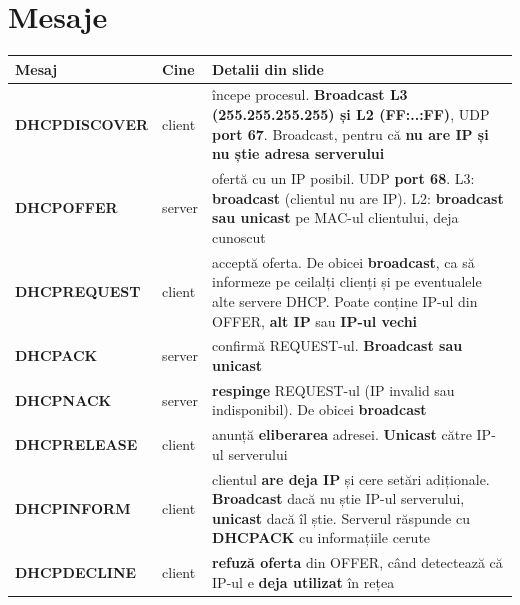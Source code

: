 \documentclass[11pt,a4paper]{article}
\begin{document}
\section{Mesaje}
\renewcommand{\arraystretch}{1.35}
\small
\begin{tabularx}{\linewidth}{@{}p{2.9cm} p{1.3cm} Y@{}}
\toprule
\textbf{Mesaj} & \textbf{Cine} & \textbf{Detalii din slide}\\
\midrule
\textbf{DHCPDISCOVER} & client & începe procesul. \textbf{Broadcast L3 (255.255.255.255) și L2 (FF:..:FF)}, UDP \textbf{port 67}. Broadcast, pentru că \textbf{nu are IP și nu știe adresa serverului}\\
\textbf{DHCPOFFER} & server & ofertă cu un IP posibil. UDP \textbf{port 68}. L3: \textbf{broadcast} (clientul nu are IP). L2: \textbf{broadcast sau unicast} pe MAC-ul clientului, deja cunoscut\\
\textbf{DHCPREQUEST} & client & acceptă oferta. De obicei \textbf{broadcast}, ca să informeze pe ceilalți clienți și pe eventualele alte servere DHCP. Poate conține IP-ul din OFFER, \textbf{alt IP} sau \textbf{IP-ul vechi}\\
\textbf{DHCPACK} & server & confirmă REQUEST-ul. \textbf{Broadcast sau unicast}\\
\textbf{DHCPNACK} & server & \textbf{respinge} REQUEST-ul (IP invalid sau indisponibil). De obicei \textbf{broadcast}\\
\textbf{DHCPRELEASE} & client & anunță \textbf{eliberarea} adresei. \textbf{Unicast} către IP-ul serverului\\
\textbf{DHCPINFORM} & client & clientul \textbf{are deja IP} și cere setări adiționale. \textbf{Broadcast} dacă nu știe IP-ul serverului, \textbf{unicast} dacă îl știe. Serverul răspunde cu \textbf{DHCPACK} cu informațiile cerute\\
\textbf{DHCPDECLINE} & client & \textbf{refuză oferta} din OFFER, când detectează că IP-ul e \textbf{deja utilizat} în rețea\\
\bottomrule
\end{tabularx}
\normalsize
\end{document}
